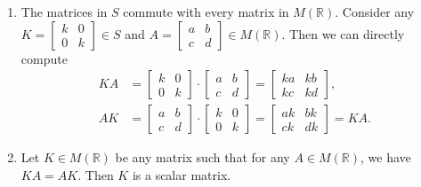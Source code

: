 \documentclass[12pt]{article}
\begin{document}
\begin{enumerate}
{        Additionally, we have an additive identity $\begin{bmatrix}
            0 & 0 \\ 0 & 0
        \end{bmatrix} \in S$ and additive inverses: \[\begin{bmatrix}
            k & 0 \\ 0 & k
        \end{bmatrix}, \begin{bmatrix}
            -k & 0 \\ 0 & -k
        \end{bmatrix} \in S.\]
    } 
    \item[b.] {
        The matrices in $S$ commute with every matrix in $M(\mathbb R)$. Consider any $K = \begin{bmatrix}k & 0 \\ 0 & k \end{bmatrix} \in S$ and $A = \begin{bmatrix}
            a & b \\ c & d
        \end{bmatrix} \in M(\mathbb R)$. Then we can directly compute 
        \begin{align*}
            K A &= \begin{bmatrix}
                k & 0 \\ 0 & k
            \end{bmatrix} \cdot \begin{bmatrix}
                a & b \\ c & d
            \end{bmatrix} = \begin{bmatrix}
                k a & k b \\ k c & k d
            \end{bmatrix}, \\
            A K &= \begin{bmatrix}
                a & b \\ c & d
            \end{bmatrix} \cdot \begin{bmatrix}
                k & 0 \\ 0 & k
            \end{bmatrix} = \begin{bmatrix}
               a k & b k \\ c k & d k 
            \end{bmatrix} = K A.
        \end{align*}
    }
    \item[c.] {
        Let $K \in M(\mathbb R)$ be any matrix such that for any $A \in M(\mathbb R)$, we have $K A = A K$. Then $K$ is a scalar matrix.

}
\end{enumerate}
\end{document}
